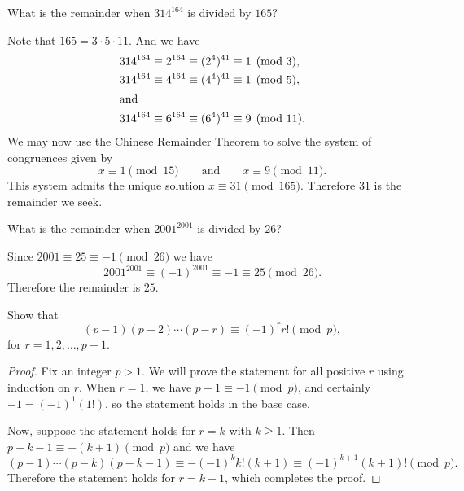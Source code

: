  What is the remainder when $314^{164}$ is divided by $165$?
\begin{solution}
  Note that $165 = 3\cdot5\cdot11$. And we have
  \begin{align*}
    314^{164}\equiv2^{164}\equiv(2^4)^{41} &\equiv 1\pmod3, \\
    314^{164}\equiv4^{164}\equiv(4^4)^{41} &\equiv 1\pmod5, \\
    \intertext{and}
    314^{164}\equiv6^{164}\equiv(6^4)^{41} &\equiv 9\pmod{11}.
  \end{align*}
  We may now use the Chinese Remainder Theorem to solve the system of
  congruences given by
  \begin{equation*}
    x \equiv 1\pmod{15} \qquad\text{and}\qquad x \equiv 9 \pmod{11}.
  \end{equation*}
  This system admits the unique solution
  $x\equiv31\pmod{165}$. Therefore $31$ is the remainder we seek.
\end{solution}

 What is the remainder when $2001^{2001}$ is divided by $26$?
\begin{solution}
  Since $2001\equiv25\equiv-1\pmod{26}$ we have
  \begin{equation*}
    2001^{2001}\equiv(-1)^{2001}\equiv-1\equiv25\pmod{26}.
  \end{equation*}
  Therefore the remainder is $25$.
\end{solution}

 Show that
\begin{equation*}
  (p - 1)(p - 2)\cdots(p - r) \equiv (-1)^rr!\pmod p,
\end{equation*}
for $r = 1, 2, \dots, p - 1$.
\begin{proof}
  Fix an integer $p > 1$. We will prove the statement for all positive
  $r$ using induction on $r$. When $r = 1$, we have
  $p - 1 \equiv -1 \pmod{p}$, and certainly $-1 = (-1)^1(1!)$, so the
  statement holds in the base case.

  Now, suppose the statement holds for $r = k$ with
  $k\geq1$. Then $p - k - 1\equiv -(k + 1)\pmod{p}$ and we have
  \begin{equation*}
    (p - 1)\cdots(p - k)(p - k - 1)
    \equiv-(-1)^kk!(k + 1) \equiv (-1)^{k+1}(k+1)!\pmod{p}.
  \end{equation*}
  Therefore the statement holds for $r = k + 1$, which completes the
  proof.
\end{proof}

